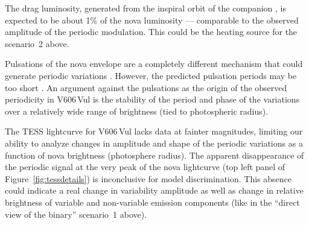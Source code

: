 \documentclass[twocolumn]{aastex631}
\newcommand{\nova}{V606\,Vul}
\begin{document}
The drag luminosity, generated from the inspiral orbit of the companion 
\citep{2006MNRAS.370.2004N}, is
expected to be about 1\% of the nova luminosity \citep[\S~5 of][]{1994ApJ...437..802K} --- comparable to 
the observed amplitude of the periodic modulation.
This could be the heating source for the scenario~2 above.

Pulsations of the nova envelope are a completely different mechanism that could generate periodic 
variations \citep{1976ApJ...208..819S,1992A&A...257..599B,1998ASPC..135..116S,2002ASPC..259..580S,2002AIPC..637..311G}.
%
However, the predicted pulsation periods may be too short \citep{2018ApJ...855..127W,2018ApJ...869....7R}.
%
An argument against the pulsations as the origin of the observed
periodicity in \nova{} is the stability of the period and phase of the
variations over a relatively wide range of brightness (tied to photospheric radius).

The TESS lightcurve for \nova{} lacks data at fainter magnitudes, 
limiting our ability to analyze changes in amplitude and shape of the periodic variations 
as a function of nova brightness (photosphere radius). 
The apparent disappearance of the periodic signal at the very peak of the nova lightcurve 
(top left panel of Figure~\ref{fig:tessdetails}) is inconclusive for model discrimination. 
This absence could indicate a real change in variability amplitude
as well as change in relative brightness of variable and non-variable
emission components (like in the ``direct view of the binary'' scenario~1 above).
\end{document}
